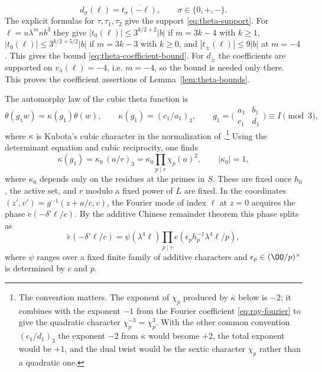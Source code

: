 \begin{equation}\label{eq:conjugate-cusp-coefficients}
 d_\sigma(\ell)=\overline{t_\sigma(-\ell)},\qquad \sigma\in\{0,+,-\}.
\end{equation}
The explicit formulas for $\tau,\tau_1,\tau_2$ give the support \eqref{eq:theta-support}. For
$\ell=u\lambda^mnb^3$ they give
$|t_0(\ell)|\le3^{k/2+2}|b|$ if $m=3k-4$ with $k\ge1$,
$|t_0(\ell)|\le3^{k/2+5/2}|b|$ if $m=3k-3$ with $k\ge0$, and $|t_\pm(\ell)|\le9|b|$ at $m=-4$.
This gives the bound \eqref{eq:theta-coefficient-bound}. For $d_\pm$ the coefficients are supported on
$v_\lambda(\ell)=-4$, i.e. $m=-4$, so the bound is needed only there. This proves the
coefficient assertions of Lemma~\ref{lem:theta-bounds}.

The automorphy law of the cubic theta function is
\begin{equation}\label{eq:theta-cusp-automorphy}
 \theta(g_1w)=\kappa(g_1)\theta(w),\qquad
 \kappa(g_1)=(c_1/a_1)_3,\qquad
 g_1=\bigl(\begin{smallmatrix}a_1&b_1\\c_1&d_1\end{smallmatrix}\bigr)\equiv I\pmod3,
\end{equation}
where $\kappa$ is Kubota's cubic character in the normalization of
\cite[(5.4), (5.6)]{DR}.\footnote{The convention matters. The exponent of $\chi_p$ produced by
$\overline{\kappa}$ below is $-2$; it combines with the exponent $-1$ from the Fourier
coefficient \eqref{eq:ray-fourier} to give the quadratic character $\chi_p^{-3}=\chi_p^3$.
With the other common convention $(c_1/d_1)_3$ the exponent $-2$ from $\overline\kappa$ would
become $+2$, the total exponent would be $+1$, and the dual twist would be the sextic character
$\chi_p$ rather than a quadratic one.} Using the determinant equation and cubic reciprocity, one
finds
\begin{equation}\label{eq:ray-multiplier}
 \kappa(g_1)=\kappa_0\,(a/r)_3=\kappa_0\prod_{p\mid r}\chi_p(a)^2,\qquad|\kappa_0|=1,
\end{equation}
where $\kappa_0$ depends only on the residues at the primes in $S$. These are fixed once $h_0$,
the active set, and $r$ modulo a fixed power of $L$ are fixed. In the coordinates
$(z',v')=g^{-1}(z+a/c,v)$, the Fourier mode of index $\ell$ at $z=0$ acquires the phase
$\breve e(-\delta'\ell/c)$. By the additive Chinese remainder theorem this phase splits as
\begin{equation}\label{eq:ray-additive-crt}
\breve e(-\delta'\ell/c)
 =\psi(\lambda^4\ell)\prod_{p\mid r}e(\epsilon_ph_p^{-1}\lambda^4\ell/p),
\end{equation}
where $\psi$ ranges over a fixed finite family of additive characters and $\epsilon_p\in(\OO/p)^\times$
is determined by $c$ and $p$.

